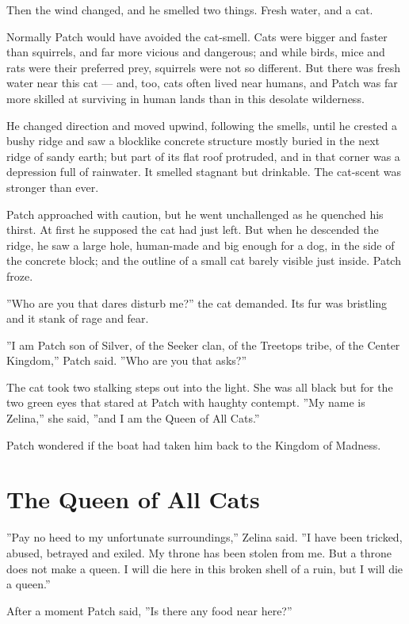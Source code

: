 \documentclass[12pt]{book}
\begin{document}
Then the wind changed, and he smelled two things. Fresh water, and a
cat.

Normally Patch would have avoided the cat-smell. Cats were bigger and
faster than squirrels, and far more vicious and dangerous; and while
birds, mice and rats were their preferred prey, squirrels were not so
different. But there was fresh water near this cat --- and, too, cats
often lived near humans, and Patch was far more skilled at surviving
in human lands than in this desolate wilderness.

He changed direction and moved upwind, following the smells, until he
crested a bushy ridge and saw a blocklike concrete structure mostly
buried in the next ridge of sandy earth; but part of its flat roof
protruded, and in that corner was a depression full of rainwater. It
smelled stagnant but drinkable. The cat-scent was stronger than ever.

Patch approached with caution, but he went unchallenged as he quenched
his thirst. At first he supposed the cat had just left. But when he
descended the ridge, he saw a large hole, human-made and big enough
for a dog, in the side of the concrete block; and the outline of a
small cat barely visible just inside. Patch froze.

''Who are you that dares disturb me?'' the cat demanded. Its fur was
bristling and it stank of rage and fear.

''I am Patch son of Silver, of the Seeker clan, of the Treetops tribe,
of the Center Kingdom,'' Patch said. ''Who are you that asks?''

The cat took two stalking steps out into the light. She was all black
but for the two green eyes that stared at Patch with haughty
contempt. ''My name is Zelina,'' she said, ''and I am the Queen of All
Cats.''

Patch wondered if the boat had taken him back to the Kingdom of
Madness.


\section{The Queen of All Cats}

''Pay no heed to my unfortunate surroundings,'' Zelina said. ''I have
been tricked, abused, betrayed and exiled. My throne has been stolen
from me. But a throne does not make a queen. I will die here in this
broken shell of a ruin, but I will die a queen.''

After a moment Patch said, ''Is there any food near here?''
\end{document}
